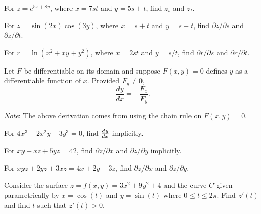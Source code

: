\documentclass[mathNotesPreamble]{subfiles}
\begin{document}
  \begin{ex*}
    For $z=e^{5x+8y}$, where $x=7st$ and $y=5s+t$, find $z_s$ and $z_t$.
  \end{ex*}
  \pagebreak

  \begin{ex*}
    For $z=\sin(2x)\cos(3y)$, where $x=s+t$ and $y=s-t$, find $\partial z/\partial s$ and $\partial z/\partial t$.
  \end{ex*}

  \begin{ex*}
    For $r=\ln(x^2+xy+y^2)$, where $x=2st$ and $y=s/t$, find $\partial r/\partial s$ and $\partial r/\partial t$.
  \end{ex*}
  \pagebreak

  \begin{thmBox*}
    Let $F$ be differentiable on its domain and suppose $F(x,y)=0$ defines $y$ as a differentiable function of $x$. Provided $F_y\neq 0$,
      \[\frac{dy}{dx}=-\frac{F_x}{F_y}.\]
  \end{thmBox*}
  
  \textit{Note}: The above derivation comes from using the chain rule on $F(x,y)=0$.
  \vspace*{2\baselineskip}
  \begin{ex*}
    For $4x^3+2x^2y-3y^3=0$, find ${\frac{d^{}y}{dx^{}}}$ implicitly.
  \end{ex*}
  \begin{ex*}
    For $xy+xz+5yz=42$, find $\partial z/\partial x$ and $\partial z/\partial y$ implicitly.
  \end{ex*}
  \pagebreak

  \begin{ex*}
    For $xyz+2yz+3xz=4x+2y-3z$, find $\partial z/\partial x$ and $\partial z/\partial y$.
  \end{ex*}

  \begin{ex*}
    Consider the surface $z=f(x,y)=3x^2+9y^2+4$ and the curve $C$ given parametrically by $x=\cos(t)$ and $y=\sin(t)$ where $0\leq t\leq 2\pi$. Find $z'(t)$ and find $t$ such that $z'(t)>0$.
  \end{ex*}

  \pagebreak
  
\end{document}
